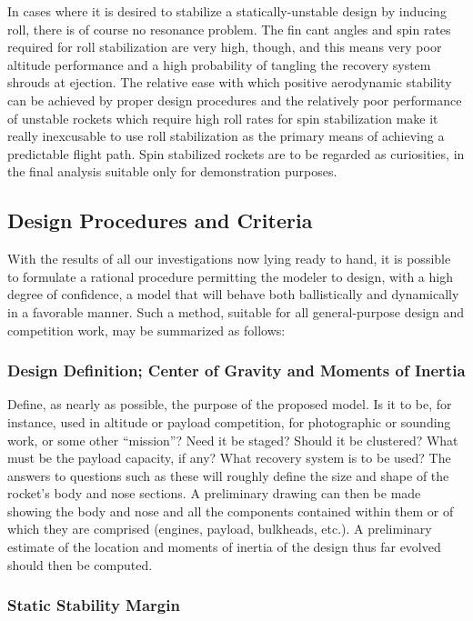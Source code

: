 In cases where it is desired to stabilize a statically-unstable design by
inducing roll, there is of course no resonance problem. The fin cant angles
and spin rates required for roll stabilization are very high, though, and
this means very poor altitude performance and a high probability of tangling
the recovery system shrouds at ejection. The relative ease with which
positive aerodynamic stability can be achieved by proper design procedures
and the relatively poor performance of unstable rockets which require high
roll rates for spin stabilization make it really inexcusable to use roll
stabilization as the primary means of achieving a predictable flight path.
Spin stabilized rockets are to be regarded as curiosities, in the final
analysis suitable only for demonstration purposes.

\subsection{Design Procedures and Criteria}\label{ch2:sec:6.4}

With the results of all our investigations now lying ready to hand, it is
possible to formulate a rational procedure permitting the modeler to design,
with a high degree of confidence, a model that will behave both ballistically
and dynamically in a favorable manner. Such a method, suitable for all
general-purpose design and competition work, may be summarized as follows:

\subsubsection{Design Definition; Center of Gravity and Moments of Inertia}\label{ch2:sec:6.4.1}

Define, as nearly as possible, the purpose of the proposed model. Is it to
be, for instance, used in altitude or payload competition, for photographic
or sounding work, or some other ``mission''? Need it be staged? Should it be
clustered? What must be the payload capacity, if any? What recovery system is
to be used? The answers to questions such as these will roughly define the
size and shape of the rocket's body and nose sections. A preliminary drawing
can then be made showing the body and nose and all the components contained
within them or of which they are comprised (engines, payload, bulkheads,
etc.). A preliminary estimate of the \CG{} location and moments of inertia of
the design thus far evolved should then be computed.

\subsubsection{Static Stability Margin}\label{ch2:sec:6.4.2}

